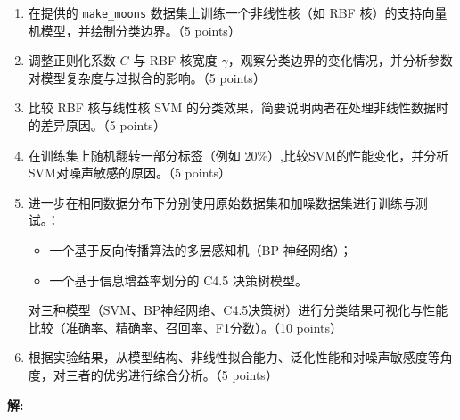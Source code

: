 \documentclass[8pt]{article}
\begin{document}
\begin{enumerate}
    \item 在提供的 \texttt{make\_moons} 数据集上训练一个非线性核（如 RBF 核）的支持向量机模型，并绘制分类边界。（5 points）

    \item 调整正则化系数 $C$ 与 RBF 核宽度 $\gamma$，观察分类边界的变化情况，并分析参数对模型复杂度与过拟合的影响。（5 points）

    \item 比较 RBF 核与线性核 SVM 的分类效果，简要说明两者在处理非线性数据时的差异原因。（5 points）

    \item 在训练集上随机翻转一部分标签（例如 20\%）,比较SVM的性能变化，并分析SVM对噪声敏感的原因。（5 points）

    \item 进一步在相同数据分布下分别使用原始数据集和加噪数据集进行训练与测试。：
    \begin{itemize}
        \item 一个基于反向传播算法的多层感知机（BP 神经网络）；
        \item 一个基于信息增益率划分的 C4.5 决策树模型。
    \end{itemize}
    对三种模型（SVM、BP神经网络、C4.5决策树）进行分类结果可视化与性能比较（准确率、精确率、召回率、F1分数）。（10 points）

    \item 根据实验结果，从模型结构、非线性拟合能力、泛化性能和对噪声敏感度等角度，对三者的优劣进行综合分析。（5 points）
\end{enumerate}




\textbf{\large 解:}
\end{document}
